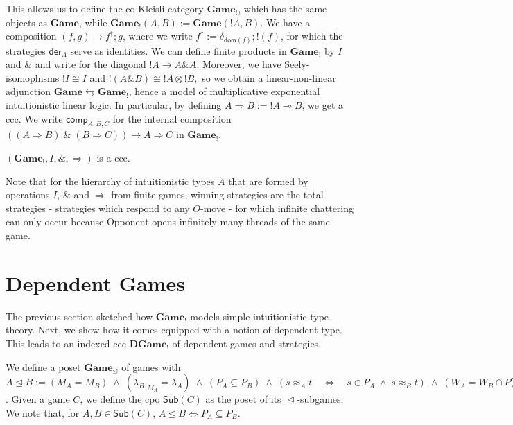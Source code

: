 \documentclass[runningheads,a4paper]{llncs}
\newcommand{\ra}[1]{\stackrel{#1}{\longrightarrow}}
\newcommand{\Gamecat}{\mathbf{Game}}
\newcommand{\DGame}{\mathbf{DGame}}
\begin{document}
This allows us to define the co-Kleisli category $\Gamecat_!$, which has the same objects as $\Gamecat$, while $\Gamecat_!(A,B):=\Gamecat(!A,B)$. We have a composition $(f,g)\mapsto f^\dagger;g$, where we write $f^\dagger:=\delta_{\mathsf{dom}(f)};!(f)$, for which the strategies $\mathsf{der}_A$ serve as identities. We can define finite products in $\Gamecat_!$ by $I$ and $\&$ and write\vspace{-5pt}\newline {} for the diagonal $!A\ra{} A\& A$. Moreover, we have Seely-isomophisms $!I\cong I$ and $!(A\&B)\cong !A\otimes !B,$ so we obtain a linear-non-linear adjunction $\Gamecat\leftrightarrows\Gamecat_!$, hence a model of multiplicative exponential intuitionistic linear logic. In particular, by defining $A\Rightarrow B:=!A\multimap B$, we get a ccc. We write $\mathsf{comp}_{A,B,C}$ for the internal composition $((A\Rightarrow B) \;\&\; (B\Rightarrow 
C))\ra{} A\Rightarrow C$ in $\Gamecat_!$.
\begin{theorem}$(\Gamecat_!,I,\&,\Rightarrow)$ is a ccc.\end{theorem}
Note that for the hierarchy of intuitionistic types $A$ that are formed by operations $I$, $\&$ and $\Rightarrow$ from finite games,  winning strategies are the total strategies - strategies which respond to any $O$-move - for which infinite chattering can only occur because Opponent opens infinitely many threads of the same game.
 \vspace{-5pt}

\section{Dependent Games}\label{sec:depgam}\vspace{-7pt}
The previous section sketched how $\Gamecat_!$ models simple intuitionistic type theory. Next, we show how it comes equipped with a notion of dependent type. This leads to an indexed ccc $\DGame_!$ of dependent games and strategies.

We define a poset $\Gamecat_\trianglelefteq$ of games with $A\trianglelefteq B:=(M_A= M_B)\;\wedge\;(\lambda_B|_{M_A}=\lambda_A)\;\wedge\;(P_A\subseteq P_B)\;\wedge\; (s\approx_A t\quad \Leftrightarrow \quad s\in P_A\;\wedge \; s\approx_B t)\;\wedge\;(W_A=W_B\cap P_A^\infty)$. Given a game $C$, we define the cpo $\mathsf{Sub}(C)$ as the poset of its $\trianglelefteq$-subgames. We note that, for $A,B\in\mathsf{Sub}(C)$, $A\trianglelefteq B \Leftrightarrow P_A\subseteq P_B$.
\end{document}
